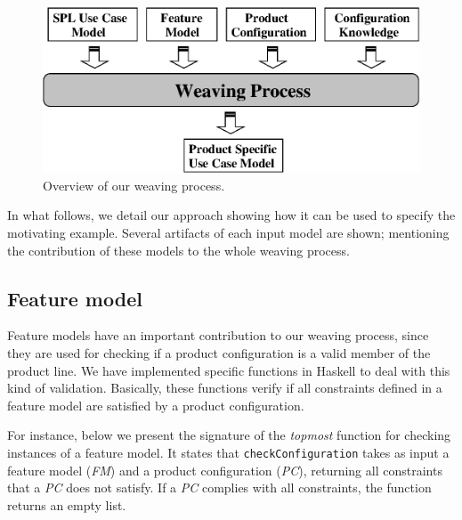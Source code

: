 \documentclass{sig-alt-full}
\begin{document}
\begin{figure}[htb]
 \begin{center}
  \includegraphics[scale=0.55]{img/weaving-process.eps}
  \caption{Overview of our weaving process.}
  \label{fig:weave-process}
  \end{center}
\end{figure}

In what follows, we detail our approach showing
how it can be used to specify the motivating example. Several artifacts of each
input model are shown; mentioning the contribution of these models to the whole
weaving process.




\subsection{Feature model}

Feature models have an important contribution to our weaving process, since they
are used for checking if a product configuration is a valid member of the product
line. We have implemented specific functions in Haskell to deal with
this kind of validation. Basically, these functions verify if all constraints defined in
a feature model are satisfied by a product configuration. 

For instance,  below we present the signature of the \emph{topmost} function
for checking instances of a feature model. It states that
\texttt{checkConfiguration} takes as input a feature model (\emph{FM}) and a
product configuration (\emph{PC}), returning all constraints that a
\emph{PC} does not satisfy. If a \emph{PC} complies with all constraints, the
function returns an empty list.
\end{document}
